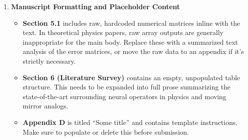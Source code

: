 \begin{enumerate}
    \item \textbf{Manuscript Formatting and Placeholder Content}
    \begin{itemize}
        \item \textbf{Section 5.1} includes raw, hardcoded numerical matrices inline with the text. In theoretical physics papers, raw array outputs are generally inappropriate for the main body. Replace these with a summarized text analysis of the error matrices, or move the raw data to an appendix if it's strictly necessary.
        \item \textbf{Section 6 (Literature Survey)} contains an empty, unpopulated table structure. This needs to be expanded into full prose summarizing the state-of-the-art surrounding neural operators in physics and moving mirror analogs. 
        \item \textbf{Appendix D} is titled ``Some title'' and contains template instructions. Make sure to populate or delete this before submission.
    \end{itemize}
\end{enumerate}

